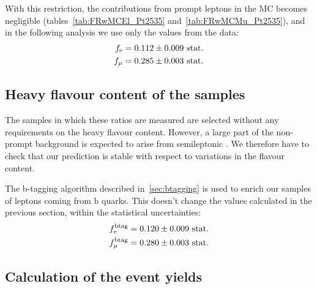 With this \pt restriction, the contributions from prompt leptons in the MC
becomes negligible (tables~\ref{tab:FRwMCEl_Pt2535}
and~\ref{tab:FRwMCMu_Pt2535}), and in the following analysis we use only the values
from the data:
\begin{align*}
    f_{\mathrm{e}} &= 0.112 \pm 0.009 \text{ stat.}\\
    f_{\mu} &= 0.285 \pm 0.003 \text{ stat.}
\end{align*}

\subsection{Heavy flavour content of the samples}
The samples in which these ratios are measured are selected without any
requirements on the heavy flavour content. However, a large part of the
non-prompt background is expected to arise from semileptonic \ttbar. We
therefore have to check that our prediction is stable with respect to
variations in the flavour content.

The b-tagging algorithm described in~\ref{sec:btagging} is used to enrich
our samples of leptons coming from b quarks. This doesn't change the values
calculated in the previous section, within the statistical uncertainties:
\begin{align*}
    f_{\mathrm{e}}^{\text{btag}} &= 0.120 \pm 0.009 \text{ stat.}\\
    f_{\mu}^{\text{btag}} &= 0.280 \pm 0.003 \text{ stat.}
\end{align*}

\subsection{Calculation of the event yields}

